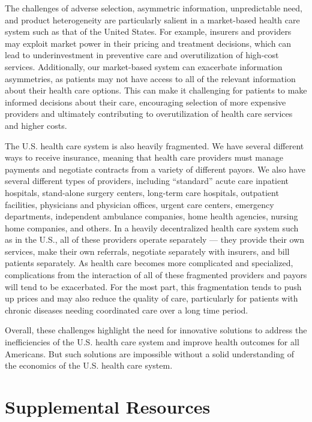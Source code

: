 \documentclass[
  letterpaper,
  DIV=11,
  numbers=noendperiod]{scrreport}
\theoremstyle{definition}
\theoremstyle{remark}
\begin{document}

The challenges of adverse selection, asymmetric information,
unpredictable need, and product heterogeneity are particularly salient
in a market-based health care system such as that of the United States.
For example, insurers and providers may exploit market power in their
pricing and treatment decisions, which can lead to underinvestment in
preventive care and overutilization of high-cost services. Additionally,
our market-based system can exacerbate information asymmetries, as
patients may not have access to all of the relevant information about
their health care options. This can make it challenging for patients to
make informed decisions about their care, encouraging selection of more
expensive providers and ultimately contributing to overutilization of
health care services and higher costs.

The U.S. health care system is also heavily fragmented. We have several
different ways to receive insurance, meaning that health care providers
must manage payments and negotiate contracts from a variety of different
payors. We also have several different types of providers, including
``standard'' acute care inpatient hospitals, stand-alone surgery
centers, long-term care hospitals, outpatient facilities, physicians and
physician offices, urgent care centers, emergency departments,
independent ambulance companies, home health agencies, nursing home
companies, and others. In a heavily decentralized health care system
such as in the U.S., all of these providers operate separately --- they
provide their own services, make their own referrals, negotiate
separately with insurers, and bill patients separately. As health care
becomes more complicated and specialized, complications from the
interaction of all of these fragmented providers and payors will tend to
be exacerbated. For the most part, this fragmentation tends to push up
prices and may also reduce the quality of care, particularly for
patients with chronic diseases needing coordinated care over a long time
period.

Overall, these challenges highlight the need for innovative solutions to
address the inefficiencies of the U.S. health care system and improve
health outcomes for all Americans. But such solutions are impossible
without a solid understanding of the economics of the U.S. health care
system.

\hypertarget{supplemental-resources}{%
\section*{Supplemental Resources}\label{supplemental-resources}}
\end{document}
